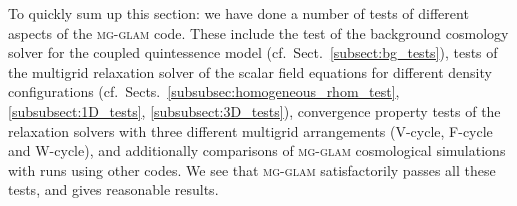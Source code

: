 To quickly sum up this section: we have done a number of tests of different aspects of the \textsc{mg-glam} code. These include the test of the background cosmology solver for the coupled quintessence model (cf.~Sect.~\ref{subsect:bg_tests}), tests of the multigrid relaxation solver of the scalar field equations for different density configurations (cf.~Sects.~\ref{subsubsec:homogeneous_rhom_test}, \ref{subsubsect:1D_tests}, \ref{subsubsect:3D_tests}), convergence property tests of the relaxation solvers with three different multigrid arrangements (V-cycle, F-cycle and W-cycle), and additionally comparisons of \textsc{mg-glam} cosmological simulations with runs using other codes. We see that \textsc{mg-glam} satisfactorily passes all these tests, and gives reasonable results. 


